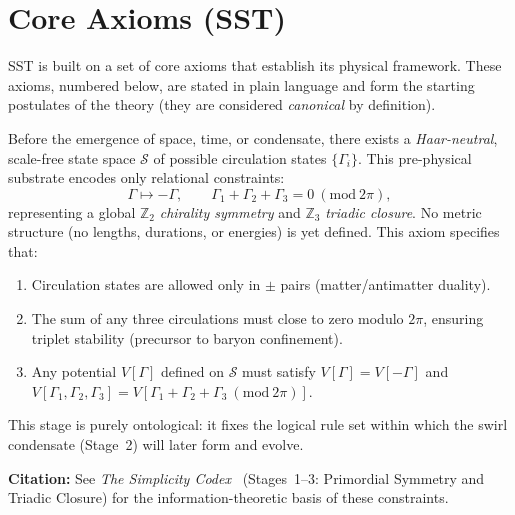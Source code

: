 \documentclass[10pt,reprint,aps,onecolumn,nofootinbib]{revtex4-2}
\begin{document}
	\section{Core Axioms (SST)}
	SST is built on a set of core axioms that establish its physical framework. These axioms, numbered below, are stated in plain language and form the starting postulates of the theory (they are considered \emph{canonical} by definition).
    \begin{tcolorbox}[title=Axiom 0: Logical Substrate (Pre-Swirl Potential)]
    Before the emergence of space, time, or condensate, there exists a
    \emph{Haar-neutral}, scale-free state space $\mathcal{S}$ of possible circulation states
    $\{\Gamma_i\}$. This pre-physical substrate encodes only relational constraints:
    \[
        \Gamma \mapsto -\Gamma,
        \qquad
        \Gamma_1 + \Gamma_2 + \Gamma_3 = 0 \ (\mathrm{mod}\ 2\pi),
    \]
    representing a global $\mathbb{Z}_2$ \emph{chirality symmetry} and
    $\mathbb{Z}_3$ \emph{triadic closure}.
    No metric structure (no lengths, durations, or energies) is yet defined.
    This axiom specifies that:
    \begin{enumerate}
    \item Circulation states are allowed only in $\pm$ pairs (matter/antimatter duality).
    \item The sum of any three circulations must close to zero modulo $2\pi$, ensuring
    triplet stability (precursor to baryon confinement).
    \item Any potential $V[\Gamma]$ defined on $\mathcal{S}$ must satisfy
    $V[\Gamma]=V[-\Gamma]$ and $V[\Gamma_1,\Gamma_2,\Gamma_3] =
    V[\Gamma_1+\Gamma_2+\Gamma_3\ (\mathrm{mod}\ 2\pi)]$.
    \end{enumerate}
    This stage is purely ontological: it fixes the logical rule set within which the
    swirl condensate (Stage~2) will later form and evolve.
    \end{tcolorbox}

    \noindent\textbf{Citation:}
    See \emph{The Simplicity Codex}~\cite{Goldau2025_STC} (Stages~1--3: Primordial Symmetry
    and Triadic Closure) for the information-theoretic basis of these constraints.
\end{document}
